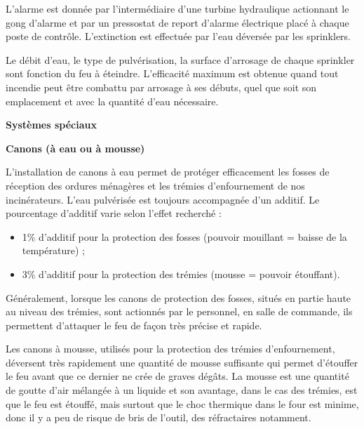 L’alarme est donnée par l’intermédiaire d’une turbine hydraulique actionnant le gong d’alarme et par un pressostat de report d’alarme électrique placé à chaque poste de contrôle. 
L’extinction est effectuée par l’eau déversée par les sprinklers. 
\vspace{0.3cm}

Le débit d’eau, le type de pulvérisation, la surface d’arrosage de chaque sprinkler sont fonction du feu à éteindre. L’efficacité maximum est obtenue quand tout incendie peut être  combattu par arrosage à ses débuts, quel que soit son emplacement et avec la quantité d’eau nécessaire.


\vspace{0.3cm}
\textbf{Systèmes spéciaux}
\vspace{0.3cm}

\textbf{Canons (à eau ou à mousse)}
\vspace{0.3cm} 

L’installation de canons à eau permet de protéger efficacement les fosses de réception des ordures ménagères et les trémies d’enfournement de nos incinérateurs. 
L’eau pulvérisée est toujours accompagnée d’un additif. Le pourcentage d’additif varie selon l’effet recherché :

\begin{itemize}
\item  1\% d’additif pour la protection des fosses (pouvoir mouillant = baisse de la température) ;
\item  3\% d’additif pour la protection des trémies (mousse = pouvoir étouffant).

\end{itemize}

Généralement, lorsque les canons de protection des fosses, situés en partie haute au niveau des trémies, sont actionnés par le personnel, en salle de commande, ils permettent d’attaquer le feu de façon très précise et rapide.
\vspace{0.3cm}

Les canons à mousse, utilisés pour la protection des trémies d’enfournement, déversent très rapidement une quantité de mousse suffisante qui permet d’étouffer le feu avant que ce dernier ne crée de graves dégâts. La mousse est une quantité de goutte d’air mélangée à un liquide et son avantage, dans le cas des trémies, est que le feu est étouffé, mais surtout que le choc thermique dans le four est minime, donc il y a peu de risque de bris de l’outil, des réfractaires notamment.
\vspace{0.3cm}

